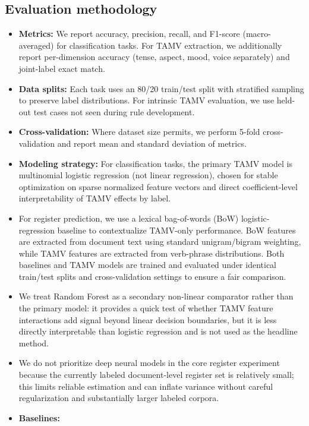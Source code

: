 \documentclass[11pt]{article}
\begin{document}
\subsection{Evaluation methodology}
\begin{itemize}
  \item \textbf{Metrics:} We report accuracy, precision, recall, and F1-score (macro-averaged) for classification tasks. For TAMV extraction, we additionally report per-dimension accuracy (tense, aspect, mood, voice separately) and joint-label exact match.
  \item \textbf{Data splits:} Each task uses an 80/20 train/test split with stratified sampling to preserve label distributions. For intrinsic TAMV evaluation, we use held-out test cases not seen during rule development.
  \item \textbf{Cross-validation:} Where dataset size permits, we perform 5-fold cross-validation and report mean and standard deviation of metrics.
  \item \textbf{Modeling strategy:} For classification tasks, the primary TAMV model is multinomial logistic regression (not linear regression), chosen for stable optimization on sparse normalized feature vectors and direct coefficient-level interpretability of TAMV effects by label.
  \item For register prediction, we use a lexical bag-of-words (BoW) logistic-regression baseline to contextualize TAMV-only performance. BoW features are extracted from document text using standard unigram/bigram weighting, while TAMV features are extracted from verb-phrase distributions. Both baselines and TAMV models are trained and evaluated under identical train/test splits and cross-validation settings to ensure a fair comparison.
  \item We treat Random Forest as a secondary non-linear comparator rather than the primary model: it provides a quick test of whether TAMV feature interactions add signal beyond linear decision boundaries, but it is less directly interpretable than logistic regression and is not used as the headline method.
  \item We do not prioritize deep neural models in the core register experiment because the currently labeled document-level register set is relatively small; this limits reliable estimation and can inflate variance without careful regularization and substantially larger labeled corpora.
  \item \textbf{Baselines:}
    \begin{itemize}

\end{itemize}
\end{itemize}
\end{document}

